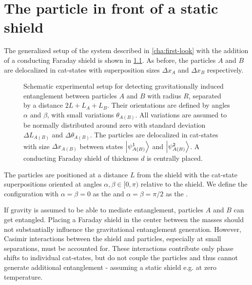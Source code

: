 \chapter{The particle in front of a static shield}\label{cha:entanglement-generation}

The generalized setup of the system described in \cref{cha:first-look} with the addition of a conducting Faraday shield is shown in \cref{fig:4:complete-setup}. As before, the particles $A$ and $B$ are delocalized in cat-states with superposition sizes $\Delta x_A$ and $\Delta x_B$ respectively.
\begin{figure}[!htbp]
  \centering
  \def\svgwidth{\textwidth}
  
  \caption{Schematic experimental setup for detecting gravitationally induced entanglement between particles $A$ and $B$ with radius $R$, separated by a distance $2L + L_A + L_B$. Their orientations are defined by angles $\alpha$ and $\beta$, with small variations $\theta_{A(B)}$. All variations are assumed to be normally distributed around zero with standard deviation $\Delta L_{A(B)}$ and $\Delta \theta_{A(B)}$. The particles are delocalized in cat-states with size $\Delta x_{A(B)}$ between states $\ket{\psi_{A(B)}^1}$ and $\ket{\psi_{A(B)}^2}$. A conducting Faraday shield of thickness $d$ is centrally placed.}
  \label{fig:4:complete-setup}
\end{figure}
The particles are positioned at a distance $L$ from the shield with the cat-state superpositions oriented at angles $\alpha,\beta\in[0,\pi)$ relative to the shield.
We define the configuration with $\alpha=\beta=0$ as the  and $\alpha = \beta = \pi/2$ as the .

If gravity is assumed to be able to mediate entanglement, particles $A$ and $B$ can get entangled.
Placing a Faraday shield in the center between the masses should not substantially influence the gravitational entanglement generation.
However, Casimir interactions between the shield and particles, especially at small separations, must be accounted for.
These interactions contribute only phase shifts to individual cat-states, but do not couple the particles and thus cannot generate additional entanglement - assuming a static shield e.g. at zero temperature.

